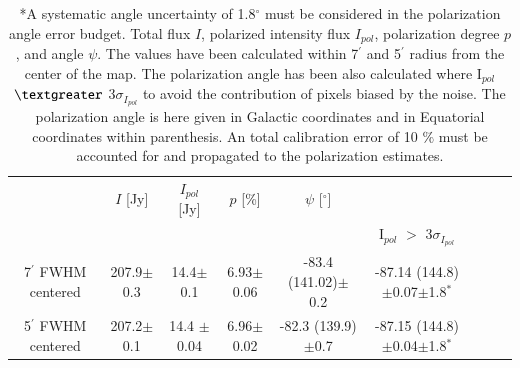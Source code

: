 \documentclass[twocolumn,traditabstract]{aa}
\begin{document}
\begin{table}
  \centering
      \begin{tabular}{ccccccccc}
      \hline
      \hline
       & $I$ [Jy] & $I_{pol}$ [Jy] & $p$ [\%] &  $\psi$ [$^\circ$] &\\      
      &  &  &  & & I$_{pol}$ $>$ 3$\sigma_{I_{pol}}$ \\
      \hline
    7$^{\prime}$ FWHM centered   & 207.9$\pm$0.3  & 14.4$\pm$0.1 & 6.93$\pm$0.06 & -83.4 (141.02)$\pm$0.2 & -87.14 (144.8)$\pm$0.07$\pm$1.8$^*$\\ 
 
    5$^{\prime}$ FWHM centered & 207.2$\pm$0.1  & 14.4 $\pm$0.04 & 6.96$\pm$0.02 & -82.3 (139.9)$\pm$0.7 & -87.15 (144.8)$\pm$0.04$\pm$1.8$^*$ \\ 
     	      
              
             
                \hline            
    \hline   
    \end{tabular}
   \caption{ 
   	*A systematic angle uncertainty of 1.8$^{\circ}$ must be considered in the polarization angle error budget.
   	 Total flux $I$, polarized intensity flux $I_{pol}$,
     polarization degree $p$, and angle $\psi$. The values have been calculated within 7$^{\prime}$ and 5$^{\prime}$ radius from the center of the map. The polarization angle has been also calculated where I$_{pol}$ $\textgreater$ 3$\sigma_{I_{pol}}$ to avoid the contribution of pixels biased by the noise.
     The polarization angle is here given in Galactic coordinates and in Equatorial coordinates within parenthesis. 
     An total calibration error of 10 $\%$ must be accounted for and propagated to the
     polarization estimates.
    }
    \label{tab:crab_results}
 \end{table}
 
\end{document}
